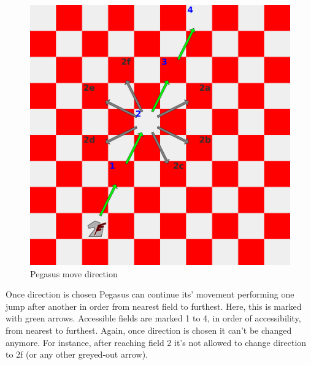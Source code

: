 \documentclass[a5paper,12pt,draft]{book} %
\begin{document}
\noindent
\begin{figure}[!t]
\includegraphics[width=1.0\textwidth, keepaspectratio=true]{../gfx/examples/02_move_pegasus_direction.png}
\caption{Pegasus move direction}
\label{fig:pegasus_move_direction}
\end{figure}
\indent
Once direction is chosen Pegasus can continue its' movement performing one jump
after another in order from nearest field to furthest. Here, this is marked
with green arrows. Accessible fields are marked 1 to 4, in order of accessibility,
from nearest to furthest. Again, once direction is chosen it can't be changed
anymore. For instance, after reaching field 2 it's not allowed to change
direction to 2f (or any other greyed-out arrow).

\clearpage
\end{document}
